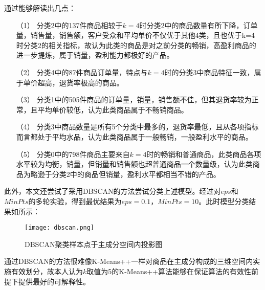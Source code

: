 \documentclass[lang=cn,11pt,a4paper,cite=authoryear]{elegantpaper}
\begin{document}
通过能够解读出几点：
\begin{itemize}
  \item [（1）] 
  分类2中的137件商品相较于$k=4$时分类2中的商品数量有所下降，订单量，销售量，销售额，客户受众和平均单价不仅优于其他4类，且也优于k=4时分类2的相关指标，故认为此类的商品是对之前分类的畅销，高盈利商品的进一步提炼，属于销量，盈利能力都极好的产品。  
  \item [（2）]
  分类4中的87件商品订单量，特点与$k=4$时的分类3中商品特征一致，属于单价超高，退货率极高的商品。
  \item [（3）]
  分类1中的505件商品的订单量，销量，销售额不佳，但其退货率较为正常，且平均单价较低，认为此类商品属于不畅销商品。
  \item[（4）]
  分类3中商品数量是所有5个分类中最多的，退货率最低，且从各项指标而言都处于平均水品，认为此类商品属于一般畅销，一般盈利水平的商品。 
  \item[（5）]
  分类0中的798件商品主要来自$k=4$时的畅销和普通商品，此类商品各项水平较为均衡，销量，但销量和销售额也超普通商品一个数量级，认为此类商品为略逊于分类2中的商品但销量，盈利水平都相当不错的产品。 
\end{itemize}

此外，本文还尝试了采用DBSCAN的方法尝试分类上述模型。经过对$eps$和$MinPts$的多轮实验，得到最优结果为$eps=0.1$，$MinPts=10$。此时模型分类结果如所示：
\begin{figure}[H]
  \centering
  \texttt{[image: dbscan.png]}
  \caption{DBSCAN聚类样本点于主成分空间内投影图}
  \label{DBSCAN聚类二维三维图}
\end{figure}

通过DBSCAN的方法很难像K-Means++一样对商品在主成分构成的三维空间内实施有效划分，故本人认为$k$取值为5的K-Means++算法能够在保证算法的有效性前提下提供最好的可解释性。
\end{document}
